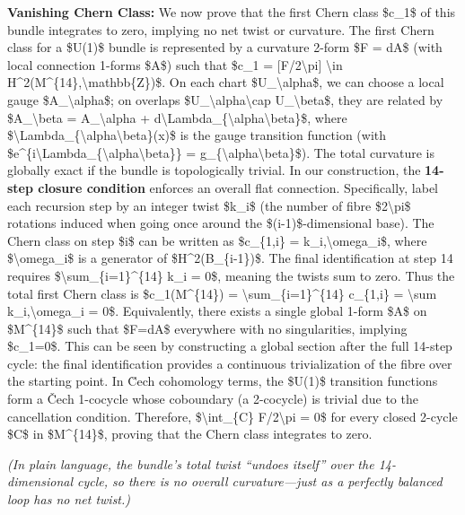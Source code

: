 \documentclass[]{article}
\begin{document}
\textbf{Vanishing Chern Class:} We now prove that the first Chern class
\$c\_1\$ of this bundle integrates to zero, implying no net twist or
curvature. The first Chern class for a \$U(1)\$ bundle is represented by
a curvature 2-form \$F = dA\$ (with local connection 1-forms \$A\$) such
that \$c\_1 = {[}F/2\textbackslash{}pi{]} \textbackslash{}in
H\^{}2(M\^{}\{14\},\textbackslash{}mathbb\{Z\})\$. On each chart
\$U\_\textbackslash{}alpha\$, we can choose a local gauge
\$A\_\textbackslash{}alpha\$; on overlaps
\$U\_\textbackslash{}alpha\textbackslash{}cap U\_\textbackslash{}beta\$,
they are related by \$A\_\textbackslash{}beta = A\_\textbackslash{}alpha
+
d\textbackslash{}Lambda\_\{\textbackslash{}alpha\textbackslash{}beta\}\$,
where
\$\textbackslash{}Lambda\_\{\textbackslash{}alpha\textbackslash{}beta\}(x)\$
is the gauge transition function (with
\$e\^{}\{i\textbackslash{}Lambda\_\{\textbackslash{}alpha\textbackslash{}beta\}\}
= g\_\{\textbackslash{}alpha\textbackslash{}beta\}\$). The total
curvature is globally exact if the bundle is topologically trivial. In
our construction, the \textbf{14-step closure condition} enforces an
overall flat connection. Specifically, label each recursion step by an
integer twist \$k\_i\$ (the number of fibre \$2\textbackslash{}pi\$
rotations induced when going once around the \$(i-1)\$-dimensional
base). The Chern class on step \$i\$ can be written as \$c\_\{1,i\} =
k\_i,\textbackslash{}omega\_i\$, where \$\textbackslash{}omega\_i\$ is a
generator of \$H\^{}2(B\_\{i-1\})\$. The final identification at step 14
requires \$\textbackslash{}sum\_\{i=1\}\^{}\{14\} k\_i = 0\$, meaning
the twists sum to zero. Thus the total first Chern class is
\$c\_1(M\^{}\{14\}) = \textbackslash{}sum\_\{i=1\}\^{}\{14\} c\_\{1,i\}
= \textbackslash{}sum k\_i,\textbackslash{}omega\_i = 0\$. Equivalently,
there exists a single global 1-form \$A\$ on \$M\^{}\{14\}\$ such that
\$F=dA\$ everywhere with no singularities, implying \$c\_1=0\$. This can
be seen by constructing a global section after the full 14-step cycle:
the final identification provides a continuous trivialization of the
fibre over the starting point. In C̆ech cohomology terms, the \$U(1)\$
transition functions form a Čech 1-cocycle whose coboundary (a
2-cocycle) is trivial due to the cancellation condition. Therefore,
\$\textbackslash{}int\_\{C\} F/2\textbackslash{}pi = 0\$ for every
closed 2-cycle \$C\$ in \$M\^{}\{14\}\$, proving that the Chern class
integrates to zero.

\emph{(In plain language, the bundle's total twist ``undoes itself''
over the 14-dimensional cycle, so there is no overall curvature---just
as a perfectly balanced loop has no net twist.)}
\end{document}
